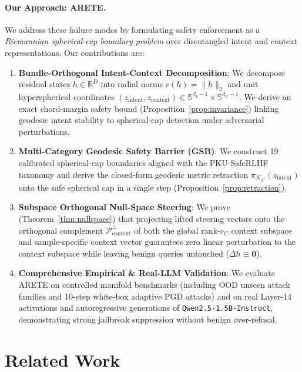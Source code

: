\documentclass[11pt,twocolumn,a4paper]{article}
\begin{document}
\paragraph{Our Approach: ARETE.}
We address these failure modes by formulating safety enforcement as a \textit{Riemannian spherical-cap boundary problem} over disentangled intent and context representations. Our contributions are:
\begin{enumerate}[leftmargin=*,nosep]
    \item \textbf{Bundle-Orthogonal Intent-Context Decomposition}: We decompose residual states $h \in \mathbb{R}^D$ into radial norms $r(h) = \|h\|_2$ and unit hyperspherical coordinates $(z_{\text{intent}}, z_{\text{context}}) \in \mathbb{S}^{d_I-1} \times \mathbb{S}^{d_C-1}$. We derive an exact chord-margin safety bound (Proposition~\ref{prop:invariance}) linking geodesic intent stability to spherical-cap detection under adversarial perturbations.
    \item \textbf{Multi-Category Geodesic Safety Barrier (GSB)}: We construct 19 calibrated spherical-cap boundaries aligned with the PKU-SafeRLHF taxonomy \citep{ji2024pkusaferlhf} and derive the closed-form geodesic metric retraction $\pi_{\mathcal{K}_{k^*}}(z_{\text{intent}})$ onto the safe spherical cap in a single step (Proposition~\ref{prop:retraction}).
    \item \textbf{Subspace Orthogonal Null-Space Steering}: We prove (Theorem~\ref{thm:nullspace}) that projecting lifted steering vectors onto the orthogonal complement $\mathcal{P}_{\text{context}}^\perp$ of both the global rank-$r_C$ context subspace and sample-specific context vector guarantees zero linear perturbation to the context subspace while leaving benign queries untouched ($\Delta h \equiv \mathbf{0}$).
    \item \textbf{Comprehensive Empirical \& Real-LLM Validation}: We evaluate ARETE on controlled manifold benchmarks (including OOD unseen attack families and 10-step white-box adaptive PGD attacks) and on real Layer-14 activations and autoregressive generations of \texttt{Qwen2.5-1.5B-Instruct}, demonstrating strong jailbreak suppression without benign over-refusal.
\end{enumerate}

\section{Related Work}
\label{sec:related}
\end{document}
